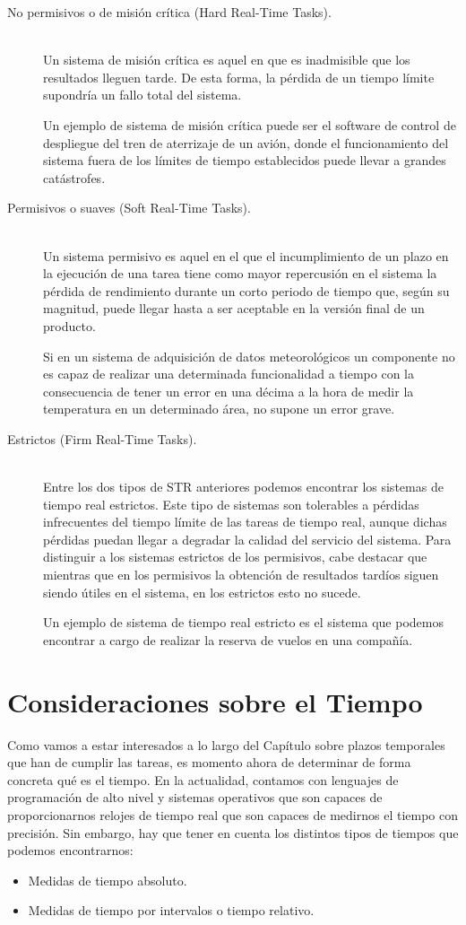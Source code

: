 \begin{description}
    \item [No permisivos o de misión crítica (Hard Real-Time Tasks).]~\\
        Un sistema de misión crítica es aquel en que es inadmisible que los resultados lleguen tarde. De esta forma, la pérdida de un tiempo límite supondría un fallo total del sistema.

        Un ejemplo de sistema de misión crítica puede ser el software de control de despliegue del tren de aterrizaje de un avión, donde el funcionamiento del sistema fuera de los límites de tiempo establecidos puede llevar a grandes catástrofes.
    \item [Permisivos o suaves (Soft Real-Time Tasks).]~\\
        Un sistema permisivo es aquel en el que el incumplimiento de un plazo en la ejecución de una tarea tiene como mayor repercusión en el sistema la pérdida de rendimiento durante un corto periodo de tiempo que, según su magnitud, puede llegar hasta a ser aceptable en la versión final de un producto.

        Si en un sistema de adquisición de datos meteorológicos un componente no es capaz de realizar una determinada funcionalidad a tiempo con la consecuencia de tener un error en una décima a la hora de medir la temperatura en un determinado área, no supone un error grave.
    \item [Estrictos (Firm Real-Time Tasks).]~\\
        Entre los dos tipos de STR anteriores podemos encontrar los sistemas de tiempo real estrictos. Este tipo de sistemas son tolerables a pérdidas infrecuentes del tiempo límite de las tareas de tiempo real, aunque dichas pérdidas puedan llegar a degradar la calidad del servicio del sistema. Para distinguir a los sistemas estrictos de los permisivos, cabe destacar que mientras que en los permisivos la obtención de resultados tardíos siguen siendo útiles en el sistema, en los estrictos esto no sucede.

        Un ejemplo de sistema de tiempo real estricto es el sistema que podemos encontrar a cargo de realizar la reserva de vuelos en una compañía.
\end{description}

\section{Consideraciones sobre el Tiempo}
Como vamos a estar interesados a lo largo del Capítulo sobre plazos temporales que han de cumplir las tareas, es momento ahora de determinar de forma concreta qué es el tiempo. En la actualidad, contamos con lenguajes de programación de alto nivel y sistemas operativos que son capaces de proporcionarnos relojes de tiempo real que son capaces de medirnos el tiempo con precisión. Sin embargo, hay que tener en cuenta los distintos tipos de tiempos que podemos encontrarnos:
\begin{itemize}
    \item Medidas de tiempo absoluto.
    \item Medidas de tiempo por intervalos o tiempo relativo.
\end{itemize}

